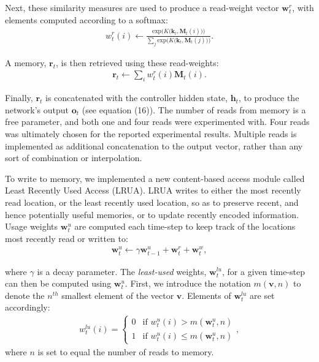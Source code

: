 \documentclass{article}
\begin{document}
Next, these similarity measures are used to produce a read-weight vector $\mathbf{w}_t^r$, with elements computed according to a softmax:
\begin{align}
    w_t^{r}(i) \leftarrow \frac{\text{exp}\big(K\big(\mathbf{k}_t, \mathbf{M}_{t}(i)\big)\big)}{\sum_j \text{exp} \big( K\big(\mathbf{k}_t, \mathbf{M}_{t}(j)\big)\big)}.
\end{align}

A memory, $\mathbf{r}_t$, is then retrieved using these read-weights:
\begin{align}
    \mathbf{r}_t \leftarrow \sum_i {w}_t^{r}(i)\mathbf{M}_{t}(i).
\end{align}

Finally, $\mathbf{r}_t$ is concatenated with the controller hidden state, $\mathbf{h}_t$, to produce the network's output $\mathbf{o}_t$ (see equation (16)). The number of reads from memory is a free parameter, and both one and four reads were experimented with. Four reads was ultimately chosen for the reported experimental results. Multiple reads is implemented as additional concatenation to the output vector, rather than any sort of combination or interpolation. 

To write to memory, we implemented a new content-based access module called Least Recently Used Access (LRUA). LRUA writes to either the most recently read location, or the least recently used location, so as to preserve recent, and hence potentially useful memories, or to update recently encoded information. Usage weights $\mathbf{w}_t^u$ are computed each time-step to keep track of the locations most recently read or written to:
\begin{align}
    \mathbf{w}_t^u \leftarrow \gamma \mathbf{w}_{t-1}^u + \mathbf{w}_t^r + \mathbf{w}_t^w,
\end{align}

where $\gamma$ is a decay parameter. The \textit{least-used} weights, $\mathbf{w}_t^{lu}$, for a given time-step can then be computed using $\mathbf{w}_{t}^u$. First, we introduce the notation $m(\mathbf{v}, n)$ to denote the $n^{th}$ smallest element of the vector $\mathbf{v}$. Elements of $\mathbf{w}_{t}^{lu}$ are set accordingly:
\begin{align}
    w_{t}^{lu}(i) = 
    \left\{
	\begin{array}{ll}
		0  & \mbox{if } w_{t}^{u}(i) > m(\mathbf{w}_{t}^{u}, n) \\
		1  & \mbox{if } w_{t}^{u}(i) \le m(\mathbf{w}_{t}^{u}, n)
	\end{array}
\right. ,
\end{align}
where $n$ is set to equal the number of reads to memory.
\end{document}
